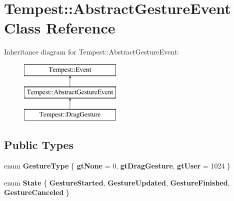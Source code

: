 \hypertarget{class_tempest_1_1_abstract_gesture_event}{\section{Tempest\+:\+:Abstract\+Gesture\+Event Class Reference}
\label{class_tempest_1_1_abstract_gesture_event}
}
Inheritance diagram for Tempest\+:\+:Abstract\+Gesture\+Event\+:\begin{figure}[H]
\begin{center}
\leavevmode
\includegraphics[height=3.000000cm]{class_tempest_1_1_abstract_gesture_event}
\end{center}
\end{figure}
\subsection*{Public Types}
\begin{DoxyCompactItemize}
\item 
\hypertarget{class_tempest_1_1_abstract_gesture_event_a0811942a3545cccda892c3e3bcbd767f}{enum {\bfseries Gesture\+Type} \{ {\bfseries gt\+None} = 0, 
{\bfseries gt\+Drag\+Gesture}, 
{\bfseries gt\+User} = 1024
 \}}\label{class_tempest_1_1_abstract_gesture_event_a0811942a3545cccda892c3e3bcbd767f}

\item 
\hypertarget{class_tempest_1_1_abstract_gesture_event_a5043ef1de12eae615db6bc57dc914c19}{enum {\bfseries State} \{ {\bfseries Gesture\+Started}, 
{\bfseries Gesture\+Updated}, 
{\bfseries Gesture\+Finished}, 
{\bfseries Gesture\+Canceled}
 \}}\label{class_tempest_1_1_abstract_gesture_event_a5043ef1de12eae615db6bc57dc914c19}

\end{DoxyCompactItemize}
